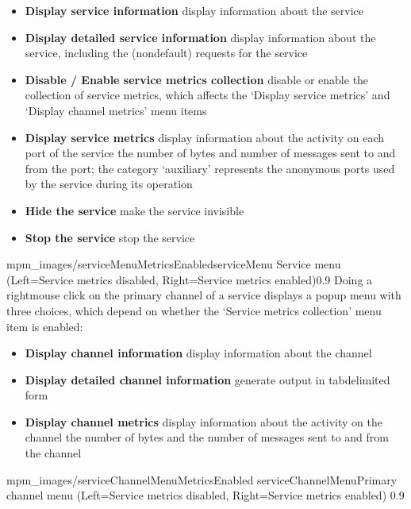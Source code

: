 \begin{itemize}
\item\textbf{Display service information} display information about the service
\item\exSp\textbf{Display detailed service information} display information about the
service, including the (non\longDash{}default) requests for the service
\item\exSp\textbf{Disable / Enable service metrics collection} disable or enable the
collection of service metrics, which affects the `Display service metrics' and `Display
channel metrics' menu items
\item\exSp\textbf{Display service metrics} display information about the activity on each
port of the service \longDash{} the number of bytes and number of messages sent to and
from the port; the category `auxiliary' represents the anonymous ports used by the service
during its operation
\item\exSp\textbf{Hide the service} make the service invisible
\item\exSp\textbf{Stop the service} stop the service
\end{itemize}
%
{mpm_images/serviceMenuMetricsEnabled}{serviceMenu}%
{Service menu (Left=Service metrics disabled, Right=Service metrics enabled)}{0.9}
\clearpage
Doing a right\longDash{}mouse click on the primary channel of a service displays a popup
menu with three choices, which depend on whether the `Service metrics collection' menu
item is enabled:
\begin{itemize}
\item\textbf{Display channel information} display information about the channel
\item\exSp\textbf{Display detailed channel information} generate output in
tab\longDash{}delimited form
\item\exSp\textbf{Display channel metrics} display information about the activity on the
channel \longDash{} the number of bytes and the number of messages sent to and from the
channel
\end{itemize}
%
{mpm_images/serviceChannelMenuMetricsEnabled}%
{serviceChannelMenu}{Primary channel menu (Left=Service metrics disabled, Right=Service
metrics enabled)}%
{0.9}

